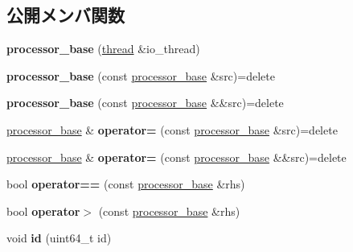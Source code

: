 \subsection*{公開メンバ関数}
\begin{DoxyCompactItemize}
\item 
\hypertarget{classprocessor__base_a0fb3660589090640decbaef29e66a100}{}{\bfseries processor\+\_\+base} (\hyperlink{classthread}{thread} \&io\+\_\+thread)\label{classprocessor__base_a0fb3660589090640decbaef29e66a100}

\item 
\hypertarget{classprocessor__base_aef9b4dfa6c564ad86d5b28210772be33}{}{\bfseries processor\+\_\+base} (const \hyperlink{classprocessor__base}{processor\+\_\+base} \&src)=delete\label{classprocessor__base_aef9b4dfa6c564ad86d5b28210772be33}

\item 
\hypertarget{classprocessor__base_a5d8c9251cdf1e4d522f16a0b605c7d6a}{}{\bfseries processor\+\_\+base} (const \hyperlink{classprocessor__base}{processor\+\_\+base} \&\&src)=delete\label{classprocessor__base_a5d8c9251cdf1e4d522f16a0b605c7d6a}

\item 
\hypertarget{classprocessor__base_a52553966ab699b15a1eb70a96211baac}{}\hyperlink{classprocessor__base}{processor\+\_\+base} \& {\bfseries operator=} (const \hyperlink{classprocessor__base}{processor\+\_\+base} \&src)=delete\label{classprocessor__base_a52553966ab699b15a1eb70a96211baac}

\item 
\hypertarget{classprocessor__base_a345a5ebd2dc94130c9a08f49fd82cb8d}{}\hyperlink{classprocessor__base}{processor\+\_\+base} \& {\bfseries operator=} (const \hyperlink{classprocessor__base}{processor\+\_\+base} \&\&src)=delete\label{classprocessor__base_a345a5ebd2dc94130c9a08f49fd82cb8d}

\item 
\hypertarget{classprocessor__base_acb2a834439a018314170c0d851869ce1}{}bool {\bfseries operator==} (const \hyperlink{classprocessor__base}{processor\+\_\+base} \&rhs)\label{classprocessor__base_acb2a834439a018314170c0d851869ce1}

\item 
\hypertarget{classprocessor__base_aacf4bb3a3a65821048dd6afa195fc99e}{}bool {\bfseries operator$>$} (const \hyperlink{classprocessor__base}{processor\+\_\+base} \&rhs)\label{classprocessor__base_aacf4bb3a3a65821048dd6afa195fc99e}

\item 
\hypertarget{classprocessor__base_a52adfd77275b92eac46e21c15b339089}{}void {\bfseries id} (uint64\+\_\+t id)\label{classprocessor__base_a52adfd77275b92eac46e21c15b339089}


\end{DoxyCompactItemize}
